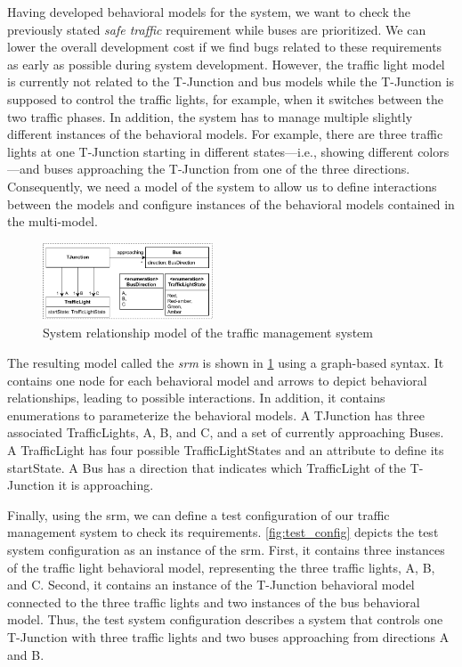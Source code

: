 \documentclass{jot}
\begin{document}
Having developed behavioral models for the system, we want to check the previously stated \emph{safe traffic} requirement while buses are prioritized.
We can lower the overall development cost if we find bugs related to these requirements as early as possible during system development.
However, the traffic light model is currently not related to the T-Junction and bus models while the T-Junction is supposed to control the traffic lights, for example, when it switches between the two traffic phases.
In addition, the system has to manage multiple slightly different instances of the behavioral models.
For example, there are three traffic lights at one T-Junction starting in different states---i.e., showing different colors---and buses approaching the T-Junction from one of the three directions.
Consequently, we need a model of the system to allow us to define interactions between the models and configure instances of the behavioral models contained in the multi-model.

\begin{figure}[h]
    \centering
    \includegraphics[width=0.45\textwidth]{figures/systemRelationShipModel.pdf}
    \caption{System relationship model of the traffic management system}
    \label{fig:systemRelationshipModel}
\end{figure}

The resulting model called the \emph{\gls*{srm}} is shown in \cref{fig:systemRelationshipModel} using a graph-based syntax.
It contains one node for each behavioral model and arrows to depict behavioral relationships, leading to possible interactions.
In addition, it contains enumerations to parameterize the behavioral models. 
A \textsf{TJunction} has three associated \textsf{TrafficLight}s, \textsf{A}, \textsf{B}, and \textsf{C}, and a set of currently approaching \textsf{Bus}es.
A \textsf{TrafficLight} has four possible \textsf{TrafficLightState}s and an attribute to define its \textsf{startState}.
A \textsf{Bus} has a \textsf{direction} that indicates which \textsf{TrafficLight} of the T-Junction it is approaching.

Finally, using the \gls*{srm}, we can define a test configuration of our traffic management system to check its requirements.
\autoref{fig:test_config} depicts the test system configuration as an instance of the \gls*{srm}.
First, it contains three instances of the traffic light behavioral model, representing the three traffic lights, \textsf{A}, \textsf{B}, and \textsf{C}.
Second, it contains an instance of the T-Junction behavioral model connected to the three traffic lights and two instances of the bus behavioral model.
Thus, the test system configuration describes a system that controls one T-Junction with three traffic lights and two buses approaching from directions A and B.
\end{document}
